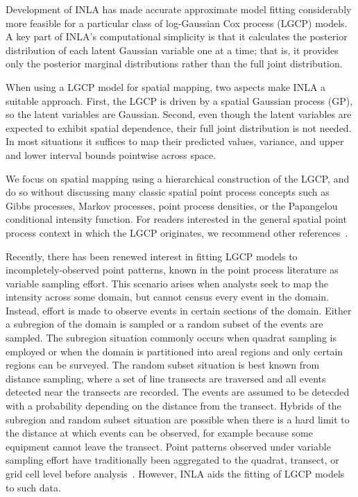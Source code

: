\documentclass[]{interact}
\begin{document}
Development of INLA has made accurate approximate model fitting considerably
more feasible for a particular class of log-Gaussian Cox process (LGCP)
models. A key part of INLA's computational simplicity is that it calculates
the posterior distribution of each latent Gaussian variable one at a time;
that is, it provides only the posterior marginal distributions rather than the
full joint distribution.

When using a LGCP model for spatial mapping, two aspects make INLA a suitable
approach. First, the LGCP is driven by a spatial Gaussian process (GP), so the
latent variables are Gaussian. Second, even though the latent variables are
expected to exhibit spatial dependence, their full joint distribution is not
needed. In most situations it suffices to map their predicted values, variance,
and upper and lower interval bounds pointwise across space.

We focus on spatial mapping using a hierarchical construction of the LGCP, and
do so without discussing many classic spatial point process concepts such as
Gibbs processes, Markov processes, point process densities, or the Papangelou
conditional intensity function. For readers interested in the general spatial
point process context in which the LGCP originates, we recommend other
references~\cite{moellerwaagepetersen, digglepoint, cressie}.


Recently, there has been renewed interest in fitting LGCP models to
incompletely-observed point patterns, known in the point process literature as
variable sampling effort. This scenario arises when analysts seek to map the
intensity across some domain, but cannot census every event in the domain.
Instead, effort is made to observe events in certain sections of the domain.
Either a subregion of the domain is sampled or a random subset of the events
are sampled. The subregion situation commonly occurs when quadrat sampling is
employed or when the domain is partitioned into areal regions and only certain
regions can be surveyed. The random subset situation is best known from
distance sampling, where a set of line transects are traversed and all events
detected near the transects are recorded. The events are assumed to be detecded
with a probability depending on the distance from the transect. Hybrids of the
subregion and random subset situation are possible when there is a hard limit
to the distance at which events can be observed, for example because some
equipment cannot leave the transect. Point patterns observed under variable
sampling effort have traditionally been aggregated to the quadrat, transect,
or grid cell level before analysis~\cite{digglepoint}. However, INLA aids the
fitting of LGCP models to such data.
\end{document}
